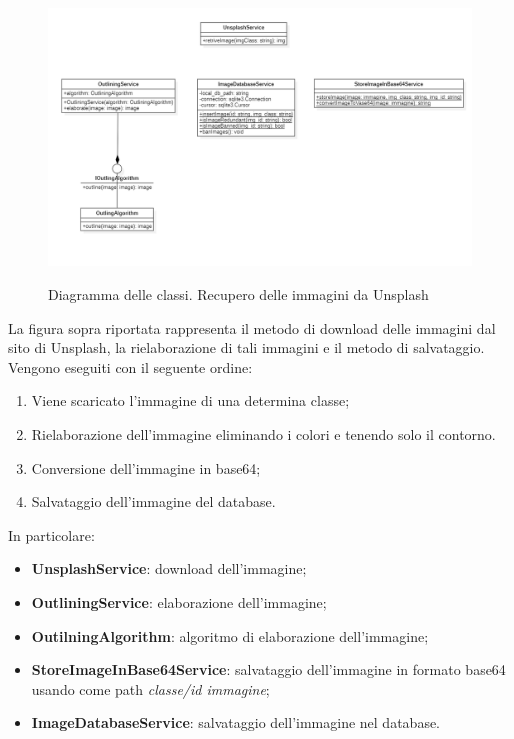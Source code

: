 \begin{figure}[H]
    \centering
    \includegraphics[scale = 0.6]{img/downloadImg.png}\\
    \caption{Diagramma delle classi. Recupero delle immagini da Unsplash}
\end{figure}

La figura sopra riportata rappresenta il metodo di download delle immagini dal sito di Unsplash, la rielaborazione di tali immagini e il metodo di salvataggio. Vengono eseguiti con il seguente ordine:
\begin{enumerate}
    \item Viene scaricato l'immagine di una determina classe;
    \item Rielaborazione dell'immagine eliminando i colori e tenendo solo il contorno.
    \item Conversione dell'immagine in base64;
    \item Salvataggio dell'immagine del database.
\end{enumerate}

In particolare:
\begin{itemize}
    \item \textbf{UnsplashService}: download dell'immagine;
    \item \textbf{OutliningService}: elaborazione dell'immagine;
    \item \textbf{OutilningAlgorithm}: algoritmo di elaborazione dell'immagine;
    \item \textbf{StoreImageInBase64Service}: salvataggio dell'immagine in formato base64 usando come path \textit{classe/id immagine};
    \item \textbf{ImageDatabaseService}: salvataggio dell'immagine nel database.
\end{itemize}


